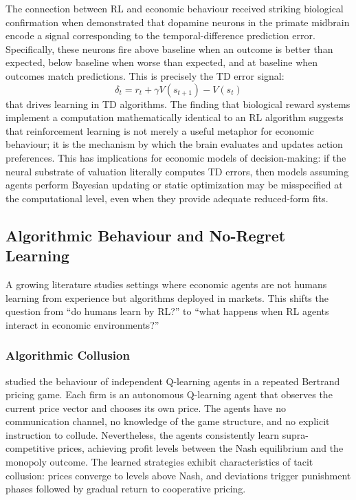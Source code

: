 The connection between RL and economic behaviour received striking biological confirmation when \citet{SchultzDayanMontague1997} demonstrated that dopamine neurons in the primate midbrain encode a signal corresponding to the temporal-difference prediction error. Specifically, these neurons fire above baseline when an outcome is better than expected, below baseline when worse than expected, and at baseline when outcomes match predictions. This is precisely the TD error signal:
\begin{equation}
\delta_t = r_t + \gamma V(s_{t+1}) - V(s_t)
\end{equation}
that drives learning in TD algorithms. The finding that biological reward systems implement a computation mathematically identical to an RL algorithm suggests that reinforcement learning is not merely a useful metaphor for economic behaviour; it is the mechanism by which the brain evaluates and updates action preferences. This has implications for economic models of decision-making: if the neural substrate of valuation literally computes TD errors, then models assuming agents perform Bayesian updating or static optimization may be misspecified at the computational level, even when they provide adequate reduced-form fits.

\subsection{Algorithmic Behaviour and No-Regret Learning}

A growing literature studies settings where economic agents are not humans learning from experience but algorithms deployed in markets. This shifts the question from ``do humans learn by RL?'' to ``what happens when RL agents interact in economic environments?''

\subsubsection{Algorithmic Collusion}

\citet{Calvano2020} studied the behaviour of independent Q-learning agents in a repeated Bertrand pricing game. Each firm is an autonomous Q-learning agent that observes the current price vector and chooses its own price. The agents have no communication channel, no knowledge of the game structure, and no explicit instruction to collude. Nevertheless, the agents consistently learn supra-competitive prices, achieving profit levels between the Nash equilibrium and the monopoly outcome. The learned strategies exhibit characteristics of tacit collusion: prices converge to levels above Nash, and deviations trigger punishment phases followed by gradual return to cooperative pricing.

